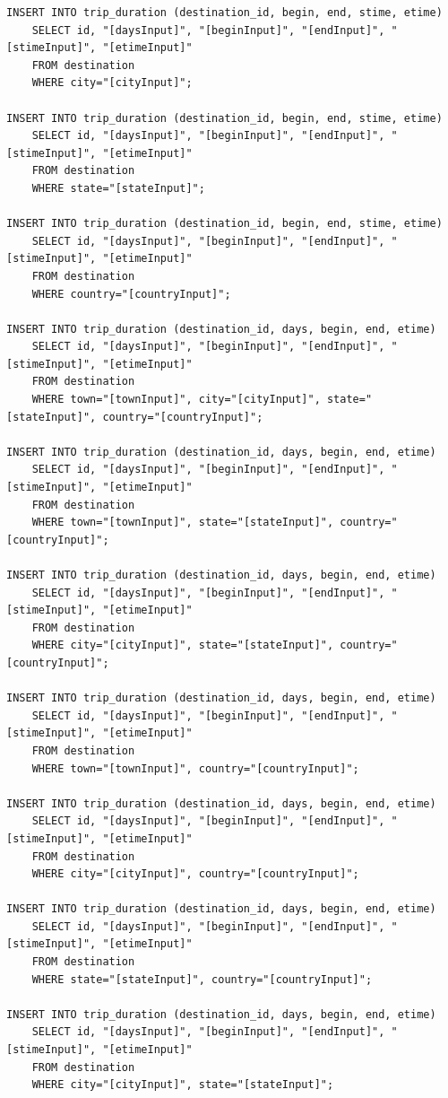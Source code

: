 \documentclass[letterpaper,10pt,onecolumn,compsoc]{IEEEtran}
\begin{document}
\begin{verbatim}
INSERT INTO trip_duration (destination_id, begin, end, stime, etime) 
	SELECT id, "[daysInput]", "[beginInput]", "[endInput]", "[stimeInput]", "[etimeInput]" 
	FROM destination 
	WHERE city="[cityInput]";
	
INSERT INTO trip_duration (destination_id, begin, end, stime, etime) 
	SELECT id, "[daysInput]", "[beginInput]", "[endInput]", "[stimeInput]", "[etimeInput]" 
	FROM destination 
	WHERE state="[stateInput]";

INSERT INTO trip_duration (destination_id, begin, end, stime, etime) 
	SELECT id, "[daysInput]", "[beginInput]", "[endInput]", "[stimeInput]", "[etimeInput]" 
	FROM destination 
	WHERE country="[countryInput]";

INSERT INTO trip_duration (destination_id, days, begin, end, etime) 
	SELECT id, "[daysInput]", "[beginInput]", "[endInput]", "[stimeInput]", "[etimeInput]" 
	FROM destination 
	WHERE town="[townInput]", city="[cityInput]", state="[stateInput]", country="[countryInput]";
	
INSERT INTO trip_duration (destination_id, days, begin, end, etime) 
	SELECT id, "[daysInput]", "[beginInput]", "[endInput]", "[stimeInput]", "[etimeInput]" 
	FROM destination 
	WHERE town="[townInput]", state="[stateInput]", country="[countryInput]";
	
INSERT INTO trip_duration (destination_id, days, begin, end, etime) 
	SELECT id, "[daysInput]", "[beginInput]", "[endInput]", "[stimeInput]", "[etimeInput]" 
	FROM destination 
	WHERE city="[cityInput]", state="[stateInput]", country="[countryInput]";
	
INSERT INTO trip_duration (destination_id, days, begin, end, etime) 
	SELECT id, "[daysInput]", "[beginInput]", "[endInput]", "[stimeInput]", "[etimeInput]" 
	FROM destination 
	WHERE town="[townInput]", country="[countryInput]";
	
INSERT INTO trip_duration (destination_id, days, begin, end, etime) 
	SELECT id, "[daysInput]", "[beginInput]", "[endInput]", "[stimeInput]", "[etimeInput]" 
	FROM destination 
	WHERE city="[cityInput]", country="[countryInput]";
	
INSERT INTO trip_duration (destination_id, days, begin, end, etime) 
	SELECT id, "[daysInput]", "[beginInput]", "[endInput]", "[stimeInput]", "[etimeInput]" 
	FROM destination 
	WHERE state="[stateInput]", country="[countryInput]";
	
INSERT INTO trip_duration (destination_id, days, begin, end, etime) 
	SELECT id, "[daysInput]", "[beginInput]", "[endInput]", "[stimeInput]", "[etimeInput]" 
	FROM destination 
	WHERE city="[cityInput]", state="[stateInput]";
	

\end{verbatim}
\end{document}
